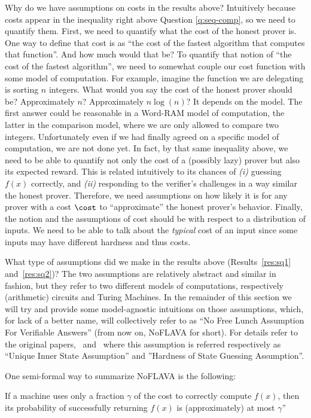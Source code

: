 {Why do we have assumptions on costs in the results above?
Intuitively because costs appear in the inequality right above Question \ref{q:seq-comp}, so we need to quantify them.
First, we need to quantify what the cost of the honest prover is. One way to define that cost is as ``the cost of the fastest algorithm that computes that function''.
And how much would that be? To quantify that notion of ``the cost of the fastest algorithm'', we need to somewhat couple our cost function with some model of computation.
For example, imagine the function we are delegating is sorting $n$ integers. What would you say the cost of the honest prover should be? Approximately $n$? Approximately $n \log(n)$?
It depends on the model. The first answer could be reasonable in a Word-RAM model of computation, the latter in the comparison model, where we are only allowed to compare two integers.
Unfortunately even if we had finally agreed on a specific model of computation, we are not done yet. In fact, by that same inequality above, we need to be able to quantify not only the cost of a (possibly lazy) prover
but also its expected reward. This is related intuitively to its chances of \emph{(i)} guessing $f(x)$ correctly, and \emph{(ii)} responding to the verifier's challenges
in a way similar the honest prover. Therefore, we need assumptions on how likely it is for any prover with a cost $\cost$ to ``approximate'' the honest prover's behavior.
Finally, the notion and the assumptions of cost should be with respect to a distribution of inputs. We need to be able to talk about the \emph{typical} cost of an input since some inputs may have different hardness and thus costs. 

\newcommand{\NoFLAVA}{\textsf{ NoFLAVA }}
What type of assumptions did we make in the results above (Results~\ref{res:sq1} and~\ref{res:sq2})? The two assumptions are relatively abstract and similar in fashion, but they refer to two different models of computations, respectively (arithmetic) circuits and Turing Machines. In the remainder of this section we will try and provide some model-agnostic intuitions on those assumptions, which, for lack of a better name, will collectively refer  to as ``No Free Lunch Assumption For Verifiable Answers'' (from now on, \NoFLAVA for short). For details refer to the original papers,~\cite{cg15} and~\cite{cg17} where this assumption is referred respectively as ``Unique Inner State Assumption'' and ''Hardness of State Guessing Assumption''.

One semi-formal way to summarize \NoFLAVA is the following: 
\begin{displayquote}
	If a machine uses only a fraction $\gamma$ of the cost to correctly compute $f(x)$, then its probability of successfully returning $f(x)$ is (approximately) at most $\gamma$''
\end{displayquote}

}
